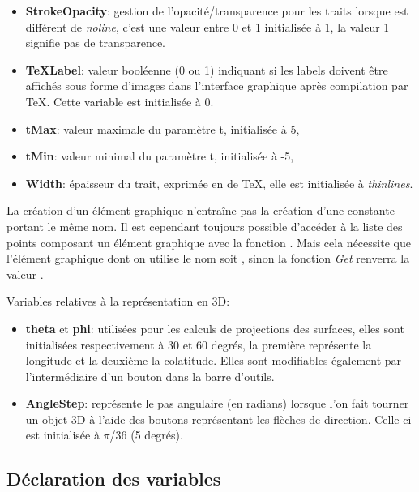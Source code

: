 \begin{itemize}
    \item \textbf{StrokeOpacity}: gestion de l'opacité/transparence pour les traits lorsque  est différent de \textsl{noline}, c'est une valeur entre 0 et 1 initialisée à $1$, la valeur 1 signifie pas de transparence.

     \item \textbf{TeXLabel}: valeur booléenne (0 ou 1) indiquant si les labels doivent être affichés sous forme d'images dans l'interface graphique après compilation par TeX. Cette variable est initialisée à 0.

     \item \textbf{tMax}: valeur maximale du paramètre t, initialisée à 5,
     \item \textbf{tMin}: valeur minimal du paramètre t, initialisée à -5,
     \item \textbf{Width}: épaisseur du trait, exprimée en  de TeX, elle est initialisée à \textit{thinlines}.
\end{itemize}

La création d'un élément graphique n'entraîne pas la création d'une constante portant le même nom. Il est cependant toujours  possible d'accéder à la liste des points composant un élément graphique avec la fonction  . Mais cela nécessite que l'élément graphique dont on utilise le nom soit , sinon la fonction \textsl{Get} renverra la valeur \Nil.

Variables relatives à la représentation en 3D:

\begin{itemize}
\item \textbf{theta} et \textbf{phi}: utilisées pour les calculs de projections des surfaces,  elles sont initialisées respectivement à 30 et 60 degrés, la première représente la longitude et la deuxième la colatitude. Elles sont modifiables également par l'intermédiaire d'un bouton dans la barre d'outils.

\item \textbf{AngleStep}: représente le pas angulaire (en radians) lorsque l'on fait tourner un objet 3D à l'aide des boutons représentant les flèches de direction. Celle-ci est initialisée à $\pi$/36 (5 degrés).
\end{itemize}

\subsection{Déclaration des variables}

